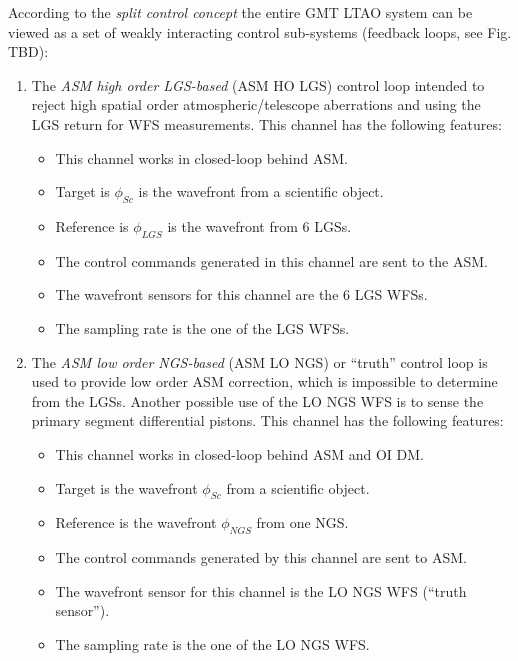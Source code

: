 \mbox{}

According to the \emph{split control concept} 
the entire GMT LTAO system can be viewed as a set of weakly interacting
control sub-systems (feedback loops, see Fig. TBD):
\begin{enumerate}
	\item The \emph{ASM high order LGS-based} (ASM HO LGS) 
	control loop intended to reject high spatial order atmospheric/telescope
	aberrations and using the LGS return for WFS measurements. This channel has
	the following features:
	\begin{itemize}
		\item This channel works in closed-loop behind ASM.
		\item Target is $\phi_{Sc}$ is the wavefront from a scientific object.
		\item Reference is $\phi_{LGS}$ is the wavefront from 6 LGSs.
	  \item The control commands generated in this channel are sent to the ASM.
	  \item The wavefront sensors for this channel are the 6 LGS WFSs.
	  \item The sampling rate is the one of the LGS WFSs.
	\end{itemize}

	\item The \emph{ASM low order NGS-based} (ASM LO NGS) or ``truth'' control
	loop is used to provide low order ASM correction, which is impossible to
	determine from the LGSs. Another possible use of the LO NGS WFS is to sense
	the primary segment differential pistons.  This channel has the following features:
	\begin{itemize}
		\item This channel works in closed-loop behind ASM and OI DM.
		\item Target is the wavefront $\phi_{Sc}$ from a scientific object.
		\item Reference is the wavefront $\phi_{NGS}$ from one NGS.
	  \item The control commands generated by this channel are sent to ASM.
	  \item The wavefront sensor for this channel is the LO NGS WFS (``truth
	  sensor'').
		\item The sampling rate is the one of the LO NGS WFS.
	\end{itemize}


\end{enumerate}
